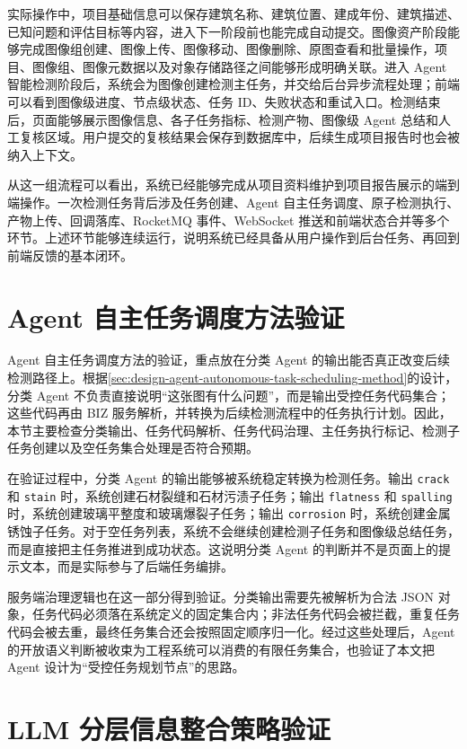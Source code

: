 实际操作中，项目基础信息可以保存建筑名称、建筑位置、建成年份、建筑描述、已知问题和评估目标等内容，进入下一阶段前也能完成自动提交。图像资产阶段能够完成图像组创建、图像上传、图像移动、图像删除、原图查看和批量操作，项目、图像组、图像元数据以及对象存储路径之间能够形成明确关联。进入 Agent 智能检测阶段后，系统会为图像创建检测主任务，并交给后台异步流程处理；前端可以看到图像级进度、节点级状态、任务 ID、失败状态和重试入口。检测结束后，页面能够展示图像信息、各子任务指标、检测产物、图像级 Agent 总结和人工复核区域。用户提交的复核结果会保存到数据库中，后续生成项目报告时也会被纳入上下文。

从这一组流程可以看出，系统已经能够完成从项目资料维护到项目报告展示的端到端操作。一次检测任务背后涉及任务创建、Agent 自主任务调度、原子检测执行、产物上传、回调落库、RocketMQ 事件、WebSocket 推送和前端状态合并等多个环节。上述环节能够连续运行，说明系统已经具备从用户操作到后台任务、再回到前端反馈的基本闭环。

\section{Agent 自主任务调度方法验证}
\label{sec:validation-agent-autonomous-task-scheduling-validation}

Agent 自主任务调度方法的验证，重点放在分类 Agent 的输出能否真正改变后续检测路径上。根据\cref{sec:design-agent-autonomous-task-scheduling-method}的设计，分类 Agent 不负责直接说明“这张图有什么问题”，而是输出受控任务代码集合；这些代码再由 BIZ 服务解析，并转换为后续检测流程中的任务执行计划。因此，本节主要检查分类输出、任务代码解析、任务代码治理、主任务执行标记、检测子任务创建以及空任务集合处理是否符合预期。

在验证过程中，分类 Agent 的输出能够被系统稳定转换为检测任务。输出 \texttt{crack} 和 \texttt{stain} 时，系统创建石材裂缝和石材污渍子任务；输出 \texttt{flatness} 和 \texttt{spalling} 时，系统创建玻璃平整度和玻璃爆裂子任务；输出 \texttt{corrosion} 时，系统创建金属锈蚀子任务。对于空任务列表，系统不会继续创建检测子任务和图像级总结任务，而是直接把主任务推进到成功状态。这说明分类 Agent 的判断并不是页面上的提示文本，而是实际参与了后端任务编排。

服务端治理逻辑也在这一部分得到验证。分类输出需要先被解析为合法 JSON 对象，任务代码必须落在系统定义的固定集合内；非法任务代码会被拦截，重复任务代码会被去重，最终任务集合还会按照固定顺序归一化。经过这些处理后，Agent 的开放语义判断被收束为工程系统可以消费的有限任务集合，也验证了本文把 Agent 设计为“受控任务规划节点”的思路。

\section{LLM 分层信息整合策略验证}
\label{sec:validation-large-language-model-hierarchical-information-integration-validation}


